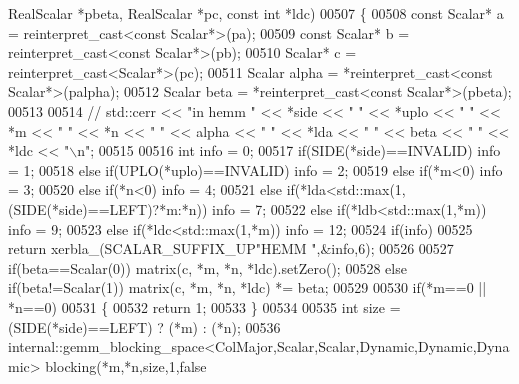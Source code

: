 \begin{DoxyCode}
       RealScalar *pbeta, RealScalar *pc, \textcolor{keyword}{const} \textcolor{keywordtype}{int} *ldc)
00507 \{
00508   \textcolor{keyword}{const} Scalar* a = \textcolor{keyword}{reinterpret\_cast<}\textcolor{keyword}{const }Scalar*\textcolor{keyword}{>}(pa);
00509   \textcolor{keyword}{const} Scalar* b = \textcolor{keyword}{reinterpret\_cast<}\textcolor{keyword}{const }Scalar*\textcolor{keyword}{>}(pb);
00510   Scalar* c = \textcolor{keyword}{reinterpret\_cast<}Scalar*\textcolor{keyword}{>}(pc);
00511   Scalar alpha = *\textcolor{keyword}{reinterpret\_cast<}\textcolor{keyword}{const }Scalar*\textcolor{keyword}{>}(palpha);
00512   Scalar beta  = *\textcolor{keyword}{reinterpret\_cast<}\textcolor{keyword}{const }Scalar*\textcolor{keyword}{>}(pbeta);
00513 
00514 \textcolor{comment}{//   std::cerr << "in hemm " << *side << " " << *uplo << " " << *m << " " << *n << " " << alpha << " " <<
       *lda << " " << beta << " " << *ldc << "\(\backslash\)n";}
00515 
00516   \textcolor{keywordtype}{int} info = 0;
00517   \textcolor{keywordflow}{if}(SIDE(*side)==INVALID)                                            info = 1;
00518   \textcolor{keywordflow}{else} \textcolor{keywordflow}{if}(UPLO(*uplo)==INVALID)                                       info = 2;
00519   \textcolor{keywordflow}{else} \textcolor{keywordflow}{if}(*m<0)                                                       info = 3;
00520   \textcolor{keywordflow}{else} \textcolor{keywordflow}{if}(*n<0)                                                       info = 4;
00521   \textcolor{keywordflow}{else} \textcolor{keywordflow}{if}(*lda<std::max(1,(SIDE(*side)==LEFT)?*m:*n))                 info = 7;
00522   \textcolor{keywordflow}{else} \textcolor{keywordflow}{if}(*ldb<std::max(1,*m))                                        info = 9;
00523   \textcolor{keywordflow}{else} \textcolor{keywordflow}{if}(*ldc<std::max(1,*m))                                        info = 12;
00524   \textcolor{keywordflow}{if}(info)
00525     \textcolor{keywordflow}{return} xerbla\_(SCALAR\_SUFFIX\_UP\textcolor{stringliteral}{"HEMM "},&info,6);
00526 
00527   \textcolor{keywordflow}{if}(beta==Scalar(0))       matrix(c, *m, *n, *ldc).setZero();
00528   \textcolor{keywordflow}{else} \textcolor{keywordflow}{if}(beta!=Scalar(1))  matrix(c, *m, *n, *ldc) *= beta;
00529 
00530   \textcolor{keywordflow}{if}(*m==0 || *n==0)
00531   \{
00532     \textcolor{keywordflow}{return} 1;
00533   \}
00534 
00535   \textcolor{keywordtype}{int} size = (SIDE(*side)==LEFT) ? (*m) : (*n);
00536   internal::gemm\_blocking\_space<ColMajor,Scalar,Scalar,Dynamic,Dynamic,Dynamic> blocking(*m,*n,size,1,\textcolor{keyword}{false}

\end{DoxyCode}
